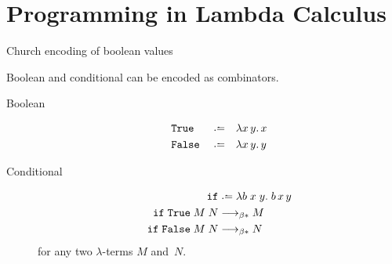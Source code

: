 \section{Programming in Lambda Calculus}
\begin{frame}{Church encoding of boolean values}
  
Boolean and conditional can be encoded as combinators.
  
\begin{description}
  \item[Boolean]
    \begin{align*}
      & \mathtt{True}  && \defeq && \lambda x\,y.\, x \\
      & \mathtt{False} && \defeq && \lambda x\,y.\, y
    \end{align*}

  \item[Conditional]
    \begin{align*}
      \mathtt{if} & \defeq \lambda b\;x\;y.\;b\,x\,y  \\
      \mathtt{if} \;\mathtt{True} \;M\;N &\reduce M \\
      \mathtt{if} \;\mathtt{False}\;M\;N &\reduce N
    \end{align*}
    for any two $\lambda$-terms $M$ and~$N$.
\end{description}

\end{frame}

